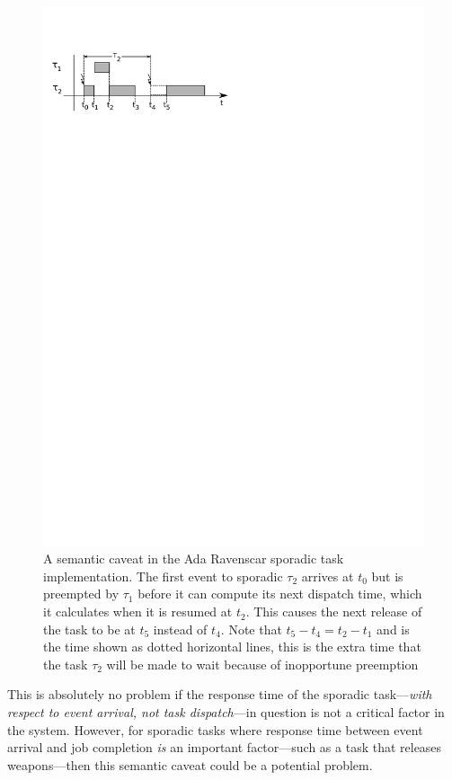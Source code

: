 \begin{figure}
\centering
\includegraphics{figs/sporadic_caveat}
\caption{A semantic caveat in the Ada Ravenscar sporadic task
  implementation. The first event to sporadic $\tau_2$ arrives at
  $t_0$ but is preempted by $\tau_1$ before it can compute its next
  dispatch time, which it calculates when it is resumed at $t_2$. This
  causes the next release of the task to be at $t_5$ instead of
  $t_4$. Note that $t_5 - t_4 = t_2 - t_1$ and is the time shown as
  dotted horizontal lines, this is the extra time that the task
  $\tau_2$ will be made to wait because of inopportune preemption}
\label{fig:caveat}
\end{figure}

This is absolutely no problem if the response time of the sporadic
task---\emph{with respect to event arrival, not task dispatch}---in
question is not a critical factor in the system. However, for sporadic
tasks where response time between event arrival and job completion
\emph{is} an important factor---such as a task that releases
weapons---then this semantic caveat could be a potential problem.

